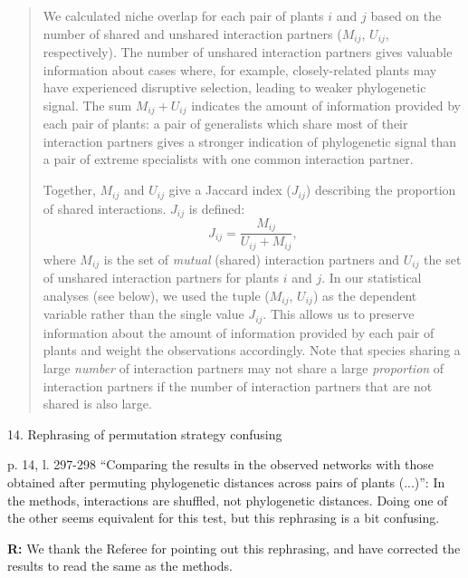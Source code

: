 \documentclass[12pt]{letter}
\newenvironment{refquote}{\bigskip \begin{it}}{\end{it}\smallskip}
\begin{document}
		\begin{quotation}

			We calculated niche overlap for each pair of plants $i$ and $j$ based on the number of shared and unshared interaction partners ($M_{ij}$, $U_{ij}$, respectively). 
			The number of unshared interaction 
			partners gives valuable information about cases where, for example, 
			closely-related plants may have experienced disruptive selection, leading to weaker phylogenetic signal. 
			The sum $M_{ij} + U_{ij}$ indicates the amount of information  provided by each pair of plants: a pair of generalists which share most of their interaction partners gives a stronger indication of phylogenetic signal than a pair of extreme specialists with one common interaction partner.


			Together, $M_{ij}$ and $U_{ij}$ give a Jaccard index ($J_{ij}$) describing 
			the proportion of shared interactions. $J_{ij}$ is defined: 
			\begin{equation}
			J_{ij} = \frac{M_{ij}}{U_{ij}+M_{ij}} ,
			\end{equation}
			where $M_{ij}$ is the set of \emph{mutual} (shared) interaction partners and $U_{ij}$ the set of unshared interaction partners for plants $i$ and $j$.
			In our statistical analyses (see below), we used the tuple ($M_{ij}$, $U_{ij}$) as the
			dependent variable rather than the single value $J_{ij}$. 
			This allows us to preserve information about the amount of information provided by each pair of plants and weight the observations accordingly.
			Note that species sharing a large \emph{number} of interaction partners may not share a large \emph{proportion} of interaction partners if the number of interaction partners that are not shared is also large.

		    \end{quotation}


	14. Rephrasing of permutation strategy confusing
		
		\begin{refquote}
			p. 14, l. 297-298 “Comparing the results in the observed networks with those obtained after permuting phylogenetic distances across pairs of plants (...)”: In the methods, interactions are shuffled, not phylogenetic distances. Doing one of the other seems equivalent for this test, but this rephrasing is a bit confusing.
		\end{refquote}


		\textbf{R:} We thank the Referee for pointing out this rephrasing, and have corrected the results to read the same as the methods.
\end{document}
